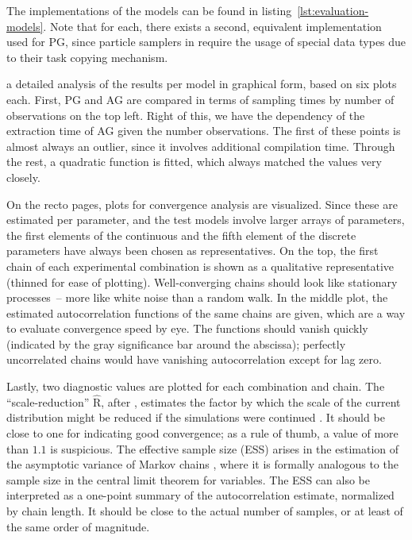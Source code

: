 The \dppljl{} implementations of the models can be found in listing~\ref{lst:evaluation-models}.
Note that for each, there exists a second, equivalent implementation used for PG, since particle
samplers in \turingjl{} require the usage of special data types due to their task copying mechanism.

 a detailed analysis of the results per model in graphical form, based on six
plots each.  First, PG and AG are compared in terms of sampling times by number of observations on
the top left.  Right of this, we have the dependency of the extraction time of AG given the number
observations.  The first of these points is almost always an outlier, since it involves additional
compilation time.  Through the rest, a quadratic function is fitted, which always matched the values
very closely.

On the recto pages, plots for convergence analysis are visualized.  Since these are estimated per
parameter, and the test models involve larger arrays of parameters, the first elements of the
continuous and the fifth element of the discrete parameters have always been chosen as
representatives.  On the top, the first chain of each experimental combination is shown as a
qualitative representative (thinned for ease of plotting).  Well-converging chains should look like
stationary processes~-- more like white noise than a random walk.  In the middle plot, the estimated
autocorrelation functions of the same chains are given, which are a way to evaluate convergence
speed by eye.  The functions should vanish quickly (indicated by the gray significance bar around
the abscissa); perfectly uncorrelated chains would have vanishing autocorrelation except for lag
zero.

Lastly, two diagnostic values are plotted for each combination and chain.  The
\enquote{scale-reduction} \(\widehat{\mathrm{R}}\), after \textcite{gelman1992inference}, estimates
the factor by which the scale of the current distribution might be reduced if the simulations were
continued \parencite[see][p. 285]{gelman2020bayesian}.  It should be close to one for indicating
good convergence; as a rule of thumb, a value of more than \(1.1\) is suspicious.  The effective
sample size (ESS) arises in the estimation of the asymptotic variance of Markov chains
\parencite[][section 7.2]{vihola2020lectures}, where it is formally analogous to the sample size in
the central limit theorem for \iid{} variables.  The ESS can also be interpreted as a one-point
summary of the autocorrelation estimate, normalized by chain length.  It should be close to the
actual number of samples, or at least of the same order of magnitude.

